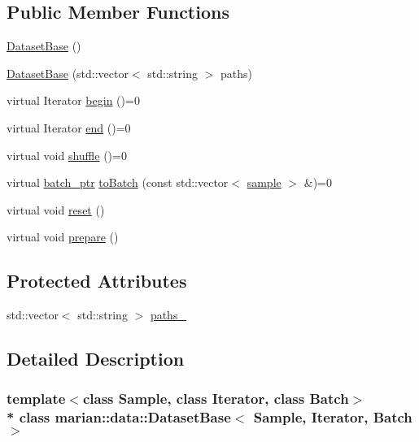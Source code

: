 \subsection*{Public Member Functions}
\begin{DoxyCompactItemize}
\item 
\hyperlink{classmarian_1_1data_1_1DatasetBase_a81594f55f2b25ac638cd616c6f550f55}{Dataset\+Base} ()
\item 
\hyperlink{classmarian_1_1data_1_1DatasetBase_a706866a93abcc9a4840ce23548dfa3b3}{Dataset\+Base} (std\+::vector$<$ std\+::string $>$ paths)
\item 
virtual Iterator \hyperlink{classmarian_1_1data_1_1DatasetBase_a3656bd4d7627dc8705ffd4a20899b746}{begin} ()=0
\item 
virtual Iterator \hyperlink{classmarian_1_1data_1_1DatasetBase_ae0ad2f60d79142852bd1ecd10a7c254a}{end} ()=0
\item 
virtual void \hyperlink{classmarian_1_1data_1_1DatasetBase_aad122bcd2636f0cbe0caf94e07a1aaf7}{shuffle} ()=0
\item 
virtual \hyperlink{classmarian_1_1data_1_1DatasetBase_a4cb5e9051a072fcc61ed4638862f01f5}{batch\+\_\+ptr} \hyperlink{classmarian_1_1data_1_1DatasetBase_af41218c6327ebf36ed3d8abd952fd1cd}{to\+Batch} (const std\+::vector$<$ \hyperlink{classmarian_1_1data_1_1DatasetBase_afc6678b770b6da1edabe3ed6d29b4bdd}{sample} $>$ \&)=0
\item 
virtual void \hyperlink{classmarian_1_1data_1_1DatasetBase_a397079308a957ee9036a81884989c047}{reset} ()
\item 
virtual void \hyperlink{classmarian_1_1data_1_1DatasetBase_a48671563fec835e08131fb05d5e0e6da}{prepare} ()
\end{DoxyCompactItemize}
\subsection*{Protected Attributes}
\begin{DoxyCompactItemize}
\item 
std\+::vector$<$ std\+::string $>$ \hyperlink{classmarian_1_1data_1_1DatasetBase_ac00940207a65687f7ea491333aedc1c1}{paths\+\_\+}
\end{DoxyCompactItemize}


\subsection{Detailed Description}
\subsubsection*{template$<$class Sample, class Iterator, class Batch$>$\\*
class marian\+::data\+::\+Dataset\+Base$<$ Sample, Iterator, Batch $>$}



